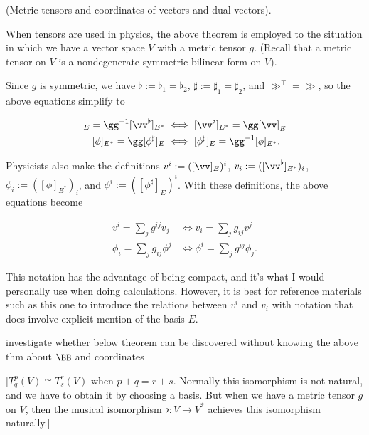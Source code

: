 \begin{remark}
    (Metric tensors and coordinates of vectors and dual vectors).
    
    When tensors are used in physics, the above theorem is employed to the situation in which we have a vector space $V$ with a metric tensor $g$. (Recall that a metric tensor on $V$ is a nondegenerate symmetric bilinear form on $V$).
    
    Since $g$ is symmetric, we have $\flat := \flat_1 = \flat_2$, $\sharp := \sharp_1 = \sharp_2$, and $\gg^\top = \gg$, so the above equations simplify to 
    
    \begin{align*}
        [\vv]_E = \gg^{-1} [\vv^{\flat}]_{E^*} &\iff [\vv^{\flat}]_{E^*} = \gg [\vv]_E \\
        [\phi]_{E^*} = \gg [\phi^{\sharp}]_E &\iff [\phi^{\sharp}]_E = \gg^{-1} [\phi]_{E^*}.
    \end{align*}
    
    Physicists also make the definitions $v^i := ([\vv]_E)^i$, $v_i := ([\vv^{\flat}]_{E^*})_i$, $\phi_i := ([\phi]_{E^*})_i$, and $\phi^i := ([\phi^{\sharp}]_E)^i$. With these definitions, the above equations become
    
    \begin{align*}
        v^i = \sum_j g^{ij} v_j &\iff v_i = \sum_j g_{ij} v^j \\
        \phi_i = \sum_j g_{ij} \phi^j &\iff \phi^i = \sum_j g^{ij} \phi_j.
    \end{align*}
    
    This notation has the advantage of being compact, and it's what I would personally use when doing calculations. However, it is best for reference materials such as this one to introduce the relations between $v^i$ and $v_i$ with notation that does involve explicit mention of the basis $E$.
\end{remark}

investigate whether below theorem can be discovered without knowing the above thm about $\BB$ and coordinates

[$T^p_q(V) \cong T^r_s(V)$ when $p + q = r + s$. Normally this isomorphism is not natural, and we have to obtain it by choosing a basis. But when we have a metric tensor $g$ on $V$, then the musical isomorphism $\flat:V \rightarrow V^*$ achieves this isomorphism naturally.]

